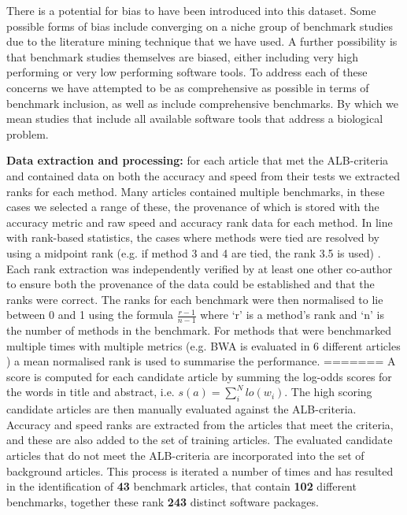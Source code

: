 \documentclass[fleqn,10pt]{SelfArx} %
\begin{document}
There is a potential for bias to have been introduced into this dataset. Some possible forms of bias include converging on a niche group of benchmark studies due to the literature mining technique that we have used. A further possibility is that benchmark studies themselves are biased, either including very high performing or very low performing software tools. To address each of these concerns we have attempted to be as comprehensive as possible in terms of benchmark inclusion, as well as include comprehensive benchmarks. By which we mean studies that include all available software tools that address a biological problem. 

\textbf{Data extraction and processing:} for each article that met the ALB-criteria and contained data on both the accuracy and speed from their tests we extracted ranks for each method. Many articles contained multiple benchmarks, in these cases we selected a range of these, the provenance of which is stored with the accuracy metric and raw speed and accuracy rank data for each method. In line with rank-based statistics, the cases where methods were tied are resolved by using a midpoint rank (e.g. if method 3 and 4 are tied, the rank 3.5 is used) \cite{Mann1947-re}. Each rank extraction was independently verified by at least one other co-author to ensure both the provenance of the data could be established and that the ranks were correct. The ranks for each benchmark were then normalised to lie between 0 and 1 using the formula $\frac{r-1}{n-1}$ where ‘r’ is a method’s rank and ‘n’ is the number of methods in the benchmark. For methods that were benchmarked multiple times with multiple metrics (e.g. BWA is evaluated in 6 different articles \cite{Bao2011-lv,Caboche2014-lj,Hatem2013-cs,Schbath2012-ob,Ruffalo2011-rl,Holtgrewe2011-fd}) a mean normalised rank is used to summarise the performance.
=======
A score is computed for each candidate article by summing the log-odds scores for the words in title and abstract, i.e. $s(a)=\sum_i^Nlo(w_i)$. The high scoring candidate articles are then manually evaluated against the ALB-criteria. Accuracy and speed ranks are extracted from the articles that meet the criteria, and these are also added to the set of training articles. The evaluated candidate articles that do not meet the ALB-criteria are incorporated into the set of background articles. This process is iterated a number of times and has resulted in the identification of \textbf{{\color{red}43}} benchmark articles, that contain \textbf{{\color{red}102}} different benchmarks, together these rank \textbf{{\color{red}243}} distinct software packages.
\end{document}

